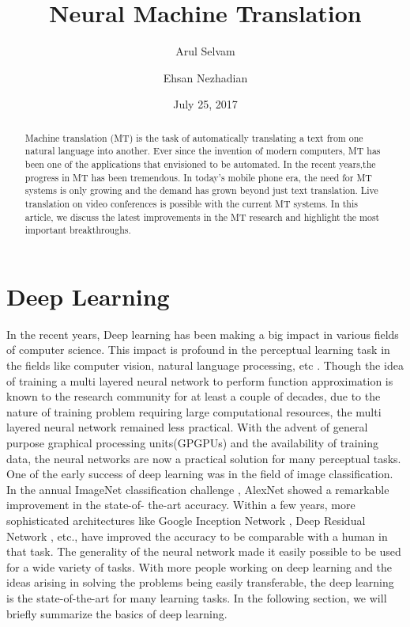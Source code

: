 \documentclass[a4paper]{article}
\begin{document}
\title{Neural Machine Translation}
\author{Arul Selvam}
\author{Ehsan Nezhadian}
\date{July 25, 2017}
\maketitle


\begin{abstract}
Machine translation (MT) is the task of automatically  translating  a  text from
one natural language into another. Ever since the invention of modern computers,
MT  has been  one of the  applications that envisioned  to be automated. In  the
recent years,the  progress in  MT has been  tremendous. In  today's mobile phone
era,  the need for MT systems is only  growing and  the demand  has grown beyond
just text  translation.  Live translation on video conferences  is possible with
the current MT systems. In this article, we discuss the  latest improvements  in
the MT research and highlight the most important breakthroughs.
\end{abstract}


\section{Deep Learning}

In  the recent years, Deep learning  has  been making  a big  impact in  various
fields of computer science. This impact is  profound in the perceptual  learning
task in  the  fields  like computer vision,  natural  language  processing,  etc
\cite{lecun2015deep}. Though the idea of training a multi layered neural network
to perform  function  approximation is known  to  the  research community for at
least  a  couple  of  decades\cite{schmidhuber2015deep}, due  to  the  nature of
training  problem  requiring large  computational resources,  the  multi layered
neural network  remained  less practical.  With  the advent of  general  purpose
graphical processing  units(GPGPUs)  and the availability of training data,  the
neural networks are now  a practical solution  for many perceptual tasks. One of
the early success of deep learning was in the field of  image classification. In
the annual  ImageNet classification challenge  \cite{deng2009imagenet},  AlexNet
\cite{krizhevsky2012imagenet} showed  a  remarkable improvement in the state-of-
the-art accuracy.  Within  a  few  years, more sophisticated  architectures like
Google  Inception Network  \cite{szegedy2016rethinking}, Deep  Residual  Network
\cite{he2016deep},  etc.,  have improved  the accuracy to  be  comparable with a
human in that task. The generality of the neural network made it easily possible
to be  used  for  a  wide variety  of tasks.  With  more  people working on deep
learning  and   the  ideas  arising  in  solving  the   problems   being  easily
transferable, the deep learning is the state-of-the-art for many learning tasks.
In the following section, we will briefly summarize the basics of deep learning.
\end{document}
